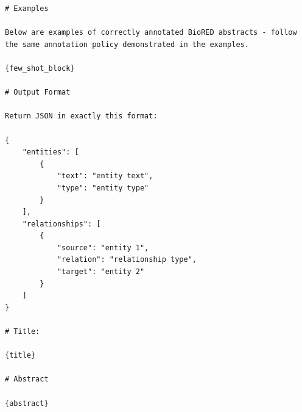 \begin{lstlisting}
# Examples

Below are examples of correctly annotated BioRED abstracts - follow the same annotation policy demonstrated in the examples.

{few_shot_block}

# Output Format

Return JSON in exactly this format:

{
	"entities": [
		{
			"text": "entity text",
			"type": "entity type"
		}
	],
	"relationships": [
		{
			"source": "entity 1",
			"relation": "relationship type",
			"target": "entity 2"
		}
	]
}

# Title:

{title}

# Abstract

{abstract}
\end{lstlisting}

